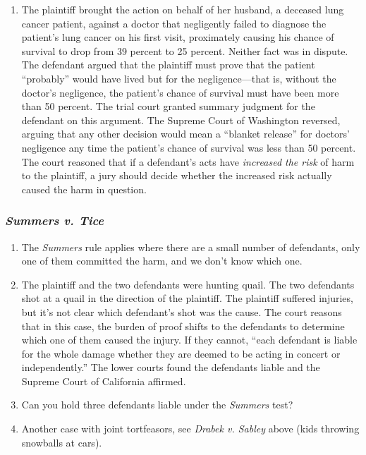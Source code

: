 \begin{enumerate}
    \item The plaintiff brought the action on behalf of her husband, a deceased lung cancer patient, against a doctor that negligently failed to diagnose the patient's lung cancer on his first visit, proximately causing his chance of survival to drop from 39 percent to 25 percent. Neither fact was in dispute. The defendant argued that the plaintiff must prove that the patient ``probably'' would have lived but for the negligence---that is, without the doctor's negligence, the patient's chance of survival must have been more than 50 percent. The trial court granted summary judgment for the defendant on this argument. The Supreme Court of Washington reversed, arguing that any other decision would mean a ``blanket release'' for doctors' negligence any time the patient's chance of survival was less than 50 percent. The court reasoned that if a defendant's acts have \emph{increased the risk} of harm to the plaintiff, a jury should decide whether the increased risk actually caused the harm in question.
\end{enumerate}

\subsubsection{\emph{Summers v. Tice}}

\begin{enumerate}
    \item The \emph{Summers} rule applies where there are a small number of defendants, only one of them committed the harm, and we don't know which one.
    \item The plaintiff and the two defendants were hunting quail. The two defendants shot at a quail in the direction of the plaintiff. The plaintiff suffered injuries, but it's not clear which defendant's shot was the cause. The court reasons that in this case, the burden of proof shifts to the defendants to determine which one of them caused the injury. If they cannot, ``each defendant is liable for the whole damage whether they are deemed to be acting in concert or independently.'' The lower courts found the defendants liable and the Supreme Court of California affirmed.
    \item Can you hold three defendants liable under the \emph{Summers} test?
    \item Another case with joint tortfeasors, see \emph{Drabek v. Sabley} above (kids throwing snowballs at cars).
\end{enumerate}

